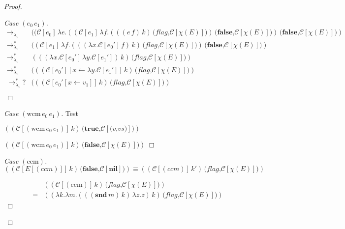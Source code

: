 \documentclass[ms,electronic,twosidetoc,letterpaper,chaptercenter,parttop]{byumsphd}
\begin{document}
\begin{proof}
\begin{proof}[Case $(e_0\,e_1)$]
\begin{align*}
\rightarrow_{\lambda_v} &((\mathcal{C}[e_0]\,\lambda e.((\mathcal{C}[e_1]\,\lambda f.(((e\,f)\,k)\,\textbf{(}\textit{flag}\textbf{,}\mathcal{C}[\chi(E)]\textbf{)})\,\textbf{(}\textbf{false}\textbf{,}\mathcal{C}[\chi(E)]\textbf{)})\,\textbf{(}\textbf{false}\textbf{,}\mathcal{C}[\chi(E)]\textbf{)})\\
\rightarrow_{\lambda_v}^{*} &((\mathcal{C}[e_1]\,\lambda f.(((\lambda x.\mathcal{C}[e_0']\,f)\,k)\,\textbf{(}\textit{flag}\textbf{,}\mathcal{C}[\chi(E)]\textbf{)})\,\textbf{(}\textbf{false}\textbf{,}\mathcal{C}[\chi(E)]\textbf{)})\\
\rightarrow_{\lambda_v}^{*} &(((\lambda x.\mathcal{C}[e_0']\,\lambda y.\mathcal{C}[e_1'])\,k)\,\textbf{(}\textit{flag}\textbf{,}\mathcal{C}[\chi(E)]\textbf{)})\\
\rightarrow_{\lambda_v}^{*} &(((\mathcal{C}[e_0'][x\leftarrow\lambda y.\mathcal{C}[e_1']]\,k)\,\textbf{(}\textit{flag}\textbf{,}\mathcal{C}[\chi(E)]\textbf{)})\\
\rightarrow_{\lambda_v}^{*}? &(((\mathcal{C}[e_0'[x\leftarrow v_1]]\,k)\,\textbf{(}\textit{flag}\textbf{,}\mathcal{C}[\chi(E)]\textbf{)})\\
\end{align*}
\end{proof}

\begin{proof}[Case $(\mathrm{wcm}\,e_0\,e_1)$]

Test

$((\mathcal{C}[(\mathrm{wcm}\,e_0\,e_1)]\,k)\,\textbf{(}\textbf{true}\textbf{,}\mathcal{C}[\textbf{(}v\textbf{,}vs\textbf{)}]\textbf{)})$

$((\mathcal{C}[(\mathrm{wcm}\,e_0\,e_1)]\,k)\,\textbf{(}\textbf{false}\textbf{,}\mathcal{C}[\chi(E)]\textbf{)})$
\end{proof}

\begin{proof}[Case $(\mathrm{ccm})$]

\[
((\mathcal{C}[E[(ccm)]]\,k)\,\textbf{(}\textbf{false}\textbf{,}\mathcal{C}[\textbf{nil}]\textbf{)})\equiv((\mathcal{C}[(ccm)]\,k')\,\textbf{(}\textit{flag}\textbf{,}\mathcal{C}[\chi(E)]\textbf{)})
\]

\begin{align*}
  &((\mathcal{C}[(\mathrm{ccm})]\,k)\,\textbf{(}\textit{flag}\textbf{,}\mathcal{C}[\chi(E)]\textbf{)})\\
= &((\lambda k.\lambda m.(((\mathbf{snd}\,m)\,k)\,\lambda z.z)\,k)\,\textbf{(}\textit{flag}\textbf{,}\mathcal{C}[\chi(E)]\textbf{)})
\end{align*}


\end{proof}
\end{proof}
\end{document}
